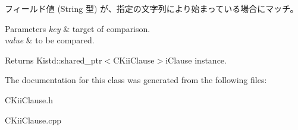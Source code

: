 フィールド値 (String 型) が、指定の文字列により始まっている場合にマッチ。 


\begin{DoxyParams}{Parameters}
{\em key} & target of comparison. \\
\hline
{\em value} & to be compared. \\
\hline
\end{DoxyParams}
\begin{DoxyReturn}{Returns}
Kistd\-::shared\-\_\-ptr$<$\-C\-Kii\-Clause$>$i\-Clause instance. 
\end{DoxyReturn}


The documentation for this class was generated from the following files\-:\begin{DoxyCompactItemize}
\item 
C\-Kii\-Clause.\-h\item 
C\-Kii\-Clause.\-cpp\end{DoxyCompactItemize}
